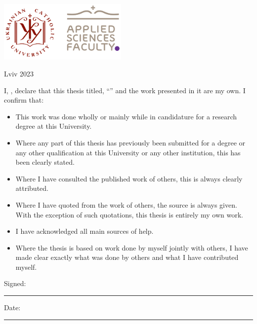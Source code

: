 \documentclass[
11pt, %
english, %
singlespacing, %
headsepline, %
openany
]{MastersDoctoralThesis} %
\begin{document}
\begin{titlepage}
\begin{center}
		\vfill
		\includegraphics[height=3cm]{UCU-Apps2022_.png} %

		\vfill
		{\large Lviv 2023}\\[4cm] %

		\vfill
	\end{center}
\end{titlepage}


\begin{declaration}
	\addchaptertocentry{\authorshipname} %
	\noindent I, \authorname, declare that this thesis titled, \enquote{\ttitle} and the work presented in it are my own. I confirm that:

	\begin{itemize}
		\item This work was done wholly or mainly while in candidature for a research degree at this University.
		\item Where any part of this thesis has previously been submitted for a degree or any other qualification at this University or any other institution, this has been clearly stated.
		\item Where I have consulted the published work of others, this is always clearly attributed.
		\item Where I have quoted from the work of others, the source is always given. With the exception of such quotations, this thesis is entirely my own work.
		\item I have acknowledged all main sources of help.
		\item Where the thesis is based on work done by myself jointly with others, I have made clear exactly what was done by others and what I have contributed myself.\\
	\end{itemize}

	\noindent Signed:\\
	\rule[0.5em]{25em}{0.5pt} %

	\noindent Date:\\
	\rule[0.5em]{25em}{0.5pt} %
\end{declaration}
\end{document}
